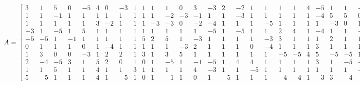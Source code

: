 \documentclass[8pt]{article}
\begin{document}
\footnotesize
$ A =
\begin{bmatrix}
  3  &  1  &  5  &  0  & -5  &  4  &  0  & -3  &  1  &  1  &  1  &  1  &  0  &  3  & -3  &  2  & -2  &  1  &  1  &  1  &  1  &  4  & -5  &  1  &  1  & -2  &  0  &  2  &  1  &  1  &  1  &  1  &  1  & -5  &  1  & -4  & -5  & -4  &  1  &  1 \\
  1  &  1  & -1  &  1  &  1  &  1  &  1  &  1  &  1  &  1  &  1  & -2  & -3  & -1  &  1  &  1  & -3  &  1  &  1  &  1  &  1  &  1  & -4  &  5  &  5  &  0  & -4  &  1  &  4  &  1  &  4  &  4  &  2  &  5  & -3  &  5  & -5  &  1  &  2  &  1 \\
  1  &  1  &  1  &  1  &  1  &  3  & -2  &  1  &  1  &  1  & -3  & -3  &  0  & -2  & -4  &  1  &  1  &  1  & -5  &  1  &  1  &  1  &  1  & -3  &  0  &  1  &  1  &  0  &  3  &  1  &  1  &  1  &  2  &  1  &  1  &  1  &  1  &  4  & -4  &  1 \\
 -3  &  1  & -5  &  1  &  5  &  1  &  1  &  1  &  1  &  1  &  1  &  1  &  1  &  1  & -5  &  1  & -5  &  1  &  1  &  2  &  4  &  1  & -4  &  1  &  1  & -1  & -1  &  1  &  4  & -4  &  1  &  1  & -2  & -1  & -3  &  1  &  1  &  4  &  4  & -4 \\
 -5  & -5  &  1  & -1  &  1  &  1  &  1  &  1  &  1  &  5  &  2  &  5  &  1  & -3  &  1  &  1  &  1  &  1  & -3  &  3  &  1  &  1  &  1  &  2  &  1  &  1  & -4  &  1  &  2  &  1  &  1  &  1  & -4  &  0  & -4  &  1  &  3  &  1  &  1  &  1 \\
  0  &  1  &  1  &  1  &  0  &  1  & -4  &  1  &  1  &  1  &  1  &  1  & -3  &  2  &  1  &  1  &  1  &  0  & -4  &  1  &  1  &  1  &  3  &  1  &  1  &  1  &  1  & -1  &  5  &  2  & -2  &  1  &  1  & -3  &  3  & -1  &  2  & -1  &  0  &  1 \\
  1  &  3  &  0  &  0  & -3  &  1  &  2  &  2  &  1  &  3  &  1  &  3  &  5  &  1  &  1  &  1  &  1  &  1  &  1  & -5  & -5  &  4  &  5  & -5  & -5  &  1  &  1  &  0  & -3  &  5  &  1  &  1  & -4  &  1  &  1  &  1  &  1  & -4  & -4  & -3 \\
  2  & -4  & -5  &  3  &  1  &  5  &  2  &  0  &  1  &  0  &  1  & -5  &  1  & -1  & -5  &  1  &  4  &  4  &  1  &  1  &  1  &  1  &  3  &  1  & -5  & -2  &  4  &  2  &  2  &  4  &  1  &  1  &  3  &  1  &  1  &  1  &  1  &  4  &  1  & -4 \\
  1  &  1  &  5  &  1  &  1  &  4  &  1  &  1  &  3  &  1  &  1  &  1  &  1  &  4  & -3  &  1  &  1  & -5  &  1  &  1  &  1  &  1  &  1  &  1  &  1  & -5  & -1  &  5  & -1  & -3  &  1  &  1  &  1  &  1  &  1  &  3  & -4  &  1  &  1  & -1 \\
  5  & -5  &  1  &  1  &  1  &  4  &  1  & -5  &  1  &  0  &  1  & -1  &  1  &  0  &  1  & -5  &  1  &  1  &  1  & -4  & -4  &  1  & -3  &  3  & -4  & -4  &  1  &  1  &  1  & -4  & -5  & -1  & -3  & -5  &  0  &  1  &  1  &  1  &  1  &  2 
\end{bmatrix}
$
\end{document}
